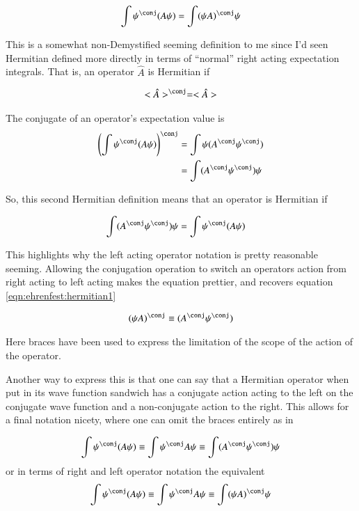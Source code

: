 \begin{align}\label{eqn:ehrenfest:hermitian1}
\int \psi^\conj (A \psi) = \int (\psi A)^\conj \psi
\end{align}

This is a somewhat non-Demystified seeming definition to me since I'd seen
Hermitian defined more directly in terms of ``normal'' right acting 
expectation integrals.  That is, an operator $\hat{A}$ is Hermitian if

\begin{align*}
<\hat{A}>^\conj = <\hat{A}>
\end{align*}

The conjugate of an operator's expectation value is
\begin{align*}
\left(\int \psi^\conj (A \psi)\right)^\conj 
&= \int \psi (A^\conj \psi^\conj) \\
&= \int (A^\conj \psi^\conj) \psi \\
\end{align*}

So, this second Hermitian definition means that an operator is Hermitian if

\begin{align*}
\int (A^\conj \psi^\conj) \psi &= \int \psi^\conj (A \psi)
\end{align*}

This highlights why the left acting operator notation is pretty reasonable
seeming.  Allowing the conjugation operation to switch an operators action
from right acting to left acting makes the equation prettier, and 
recovers equation \ref{eqn:ehrenfest:hermitian1}

\begin{align*}
(\psi A)^\conj \equiv (A^\conj \psi^\conj) 
\end{align*}

Here braces have been used to express the limitation of the scope of the action of the operator.

Another way to express this is that one can say that a Hermitian operator when put 
in its wave function sandwich has a 
conjugate action acting to the left on the conjugate wave function and a non-conjugate
action to the right.  This allows for a final notation nicety, where one can omit the 
braces entirely as in

\begin{align*}
\int \psi^\conj (A \psi) \equiv \int \psi^\conj A \psi \equiv \int (A^\conj \psi^\conj) \psi
\end{align*}
or in terms of right and left operator notation the equivalent
\begin{align*}
\int \psi^\conj (A \psi) \equiv \int \psi^\conj A \psi \equiv \int (\psi A)^\conj \psi
\end{align*}

